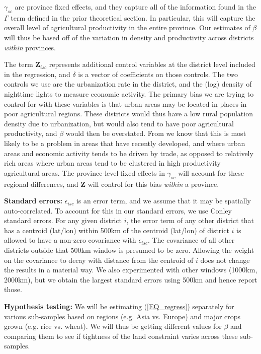 \documentclass[11pt]{article}
\begin{document}
$\gamma_{sc}$ are province fixed effects, and they capture all of the information found in the $\Gamma$ term defined in the prior theoretical section. In particular, this will capture the overall level of agricultural productivity in the entire province. Our estimates of $\beta$ will thus be based off of the variation in density and productivity across districts \textit{within} provinces. 

The term $\mathbf{Z}_{isc}$ represents additional control variables at the district level included in the regression, and $\delta$ is a vector of coefficients on those controls. The two controls we use are the urbanization rate in the district, and the (log) density of nighttime lights to measure economic activity. The primary bias we are trying to control for with these variables is that urban areas may be located in places in poor agricultural regions. These districts would thus have a low rural population density due to urbanization, but would also tend to have poor agricultural productivity, and $\beta$ would then be overstated. From \citet{hssw2016} we know that this is most likely to be a problem in areas that have recently developed, and where urban areas and economic activity tends to be driven by trade, as opposed to relatively rich areas where urban areas tend to be clustered in high productivity agricultural areas. The province-level fixed effects in $\gamma_{sc}$ will account for these regional differences, and $\mathbf{Z}$ will control for this bias \textit{within} a province.

\vspace{.5cm}\noindent\textbf{Standard errors:} $\epsilon_{isc}$ is an error term, and we assume that it may be spatially auto-correlated. To account for this in our standard errors, we use Conley standard errors. For any given district $i$, the error term of any other district that has a centroid (lat/lon) within 500km of the centroid (lat/lon) of district $i$ is allowed to have a non-zero covariance with $\epsilon_{isc}$. The covariance of all other districts outside that 500km window is presumed to be zero. Allowing the weight on the covariance to decay with distance from the centroid of $i$ does not change the results in a material way. We also experimented with other windows (1000km, 2000km), but we obtain the largest standard errors using 500km and hence report those.

\vspace{.5cm}\noindent\textbf{Hypothesis testing:} We will be estimating (\ref{EQ_regress}) separately for various sub-samples based on regions (e.g. Asia vs. Europe) and major crops grown (e.g. rice vs. wheat). We will thus be getting different values for $\beta$ and comparing them to see if tightness of the land constraint varies across these sub-samples.
 
\end{document}
